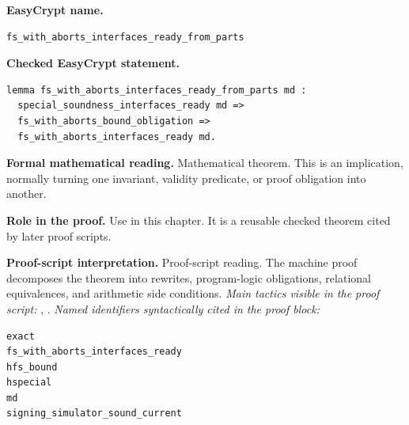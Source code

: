 \begin{formaltheorem}
\noindent\textbf{EasyCrypt name.}
\begin{lstlisting}[language=EasyCrypt,basicstyle=\ttfamily\scriptsize]
fs_with_aborts_interfaces_ready_from_parts
\end{lstlisting}
\noindent\textbf{Checked EasyCrypt statement.}
\begin{lstlisting}[language=EasyCrypt,basicstyle=\ttfamily\scriptsize]
lemma fs_with_aborts_interfaces_ready_from_parts md :
  special_soundness_interfaces_ready md =>
  fs_with_aborts_bound_obligation =>
  fs_with_aborts_interfaces_ready md.
\end{lstlisting}
\noindent\textbf{Formal mathematical reading.}
Mathematical theorem. This is an implication, normally turning one invariant, validity predicate, or proof obligation into another.

\noindent\textbf{Role in the proof.}
Use in this chapter. It is a reusable checked theorem cited by later proof scripts.

\noindent\textbf{Proof-script interpretation.}
Proof-script reading. The machine proof decomposes the theorem into rewrites, program-logic obligations, relational equivalences, and arithmetic side conditions.
\emph{Main tactics visible in the proof script:} , .
\emph{Named identifiers syntactically cited in the proof block:}
\begin{lstlisting}[language=EasyCrypt,basicstyle=\ttfamily\scriptsize]
exact
fs_with_aborts_interfaces_ready
hfs_bound
hspecial
md
signing_simulator_sound_current
\end{lstlisting}

\end{formaltheorem}

